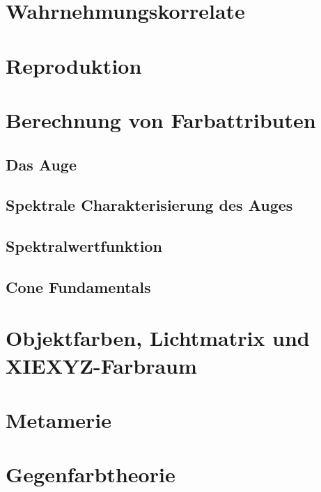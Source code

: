 \documentclass[a4paper, 11pt, accentcolor = tud3b]{tudreport}
\begin{document}
		\section{Wahrnehmungskorrelate} %

		\section{Reproduktion} %

		\section{Berechnung von Farbattributen} %

			\subsection{Das Auge} %

			\subsection{Spektrale Charakterisierung des Auges} %

			\subsection{Spektralwertfunktion} %

			\subsection{Cone Fundamentals} %

		\section{Objektfarben, Lichtmatrix und XIEXYZ-Farbraum} %

		\section{Metamerie} %

		\section{Gegenfarbtheorie} %
\end{document}
